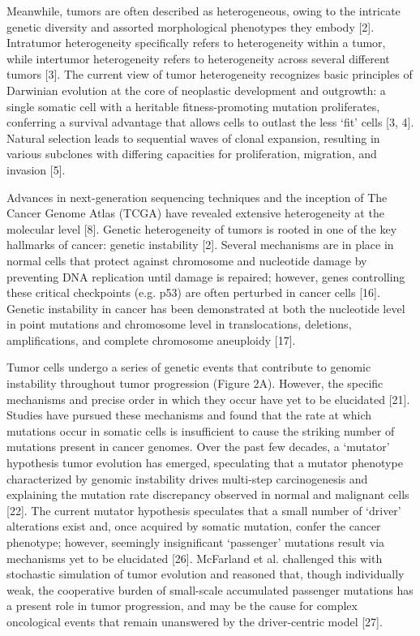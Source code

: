     Meanwhile, tumors are often described as heterogeneous, owing to the
    intricate genetic diversity and assorted morphological phenotypes they
    embody [2]. Intratumor heterogeneity specifically refers to heterogeneity
    within a tumor, while intertumor heterogeneity refers to heterogeneity
    across several different tumors [3]. The current view of tumor heterogeneity
    recognizes basic principles of Darwinian evolution at the core of neoplastic
    development and outgrowth: a single somatic cell with a heritable
    fitness-promoting mutation proliferates, conferring a survival advantage
    that allows cells to outlast the less ‘fit’ cells [3, 4]. Natural selection
    leads to sequential waves of clonal expansion, resulting in various
    subclones with differing capacities for proliferation, migration, and
    invasion [5].

    Advances in next-generation sequencing techniques and the inception of The
    Cancer Genome Atlas (TCGA) have revealed extensive heterogeneity at the
    molecular level [8]. Genetic heterogeneity of tumors is rooted in one of the
    key hallmarks of cancer: genetic instability [2]. Several mechanisms are in
    place in normal cells that protect against chromosome and nucleotide damage
    by preventing DNA replication until damage is repaired; however, genes
    controlling these critical checkpoints (e.g. p53) are often perturbed in
    cancer cells [16]. Genetic instability in cancer has been demonstrated at
    both the nucleotide level in point mutations and chromosome level in
    translocations, deletions, amplifications, and complete chromosome
    aneuploidy [17].

    Tumor cells undergo a series of genetic events that contribute to genomic
    instability throughout tumor progression (Figure 2A). However, the specific
    mechanisms and precise order in which they occur have yet to be elucidated
    [21]. Studies have pursued these mechanisms and found that the rate at which
    mutations occur in somatic cells is insufficient to cause the striking
    number of mutations present in cancer genomes. Over the past few decades, a
    ‘mutator’ hypothesis tumor evolution has emerged, speculating that a mutator
    phenotype characterized by genomic instability drives multi-step
    carcinogenesis and explaining the mutation rate discrepancy observed in
    normal and malignant cells [22].  The current mutator hypothesis speculates
    that a small number of ‘driver’ alterations exist and, once acquired by
    somatic mutation, confer the cancer phenotype; however, seemingly
    insignificant ‘passenger’ mutations result via mechanisms yet to be
    elucidated [26]. McFarland et al. challenged this with stochastic simulation
    of tumor evolution and reasoned that, though individually weak, the
    cooperative burden of small-scale accumulated passenger mutations has a
    present role in tumor progression, and may be the cause for complex
    oncological events that remain unanswered by the driver-centric model [27].

